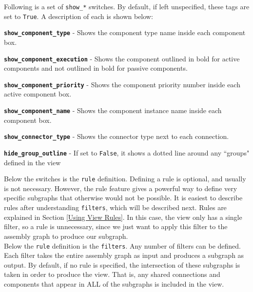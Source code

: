 Following is a set of \texttt{show\_*} switches. By default, if left unspecified, these tags are set to \texttt{True}. A description of each is shown below:

\vspace{5mm} %
\begin{spaceditemize}
  \item \textbf{\texttt{show\_component\_type}} - Shows the component type name inside each component box.
  \item \textbf{\texttt{show\_component\_execution}} - Shows the component outlined in bold for active components and not outlined in bold for passive components.
  \item \textbf{\texttt{show\_component\_priority}} - Shows the component priority number inside each active component box.
  \item \textbf{\texttt{show\_component\_name}} - Shows the component instance name inside each component box.
  \item \textbf{\texttt{show\_connector\_type}} - Shows the connector type next to each connection.
  \item \textbf{\texttt{hide\_group\_outline}} - If set to \texttt{False}, it shows a dotted line around any ``groups" defined in the view
\end{spaceditemize}
\vspace{5mm} %

Below the switches is the \texttt{rule} definition. Defining a rule is optional, and usually is not necessary. However, the rule feature gives a powerful way to define very specific subgraphs that otherwise would not be possible. It is easiest to describe rules after understanding \texttt{filters}, which will be described next. Rules are explained in Section \ref{Using View Rules}. In this case, the view only has a single filter, so a rule is unnecessary, since we just want to apply this filter to the assembly graph to produce our subgraph. \\

Below the \texttt{rule} definition is the \texttt{filters}. Any number of filters can be defined. Each filter takes the entire assembly graph as input and produces a subgraph as output. By default, if no rule is specified, the intersection of these subgraphs is taken in order to produce the view. That is, any shared connections and components that appear in ALL of the subgraphs is included in the view. \\

